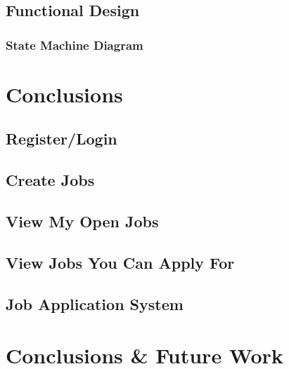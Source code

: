 \section{Functional Design}

\subsection{State Machine Diagram}



\chapter{Conclusions}

\section{Register/Login}

\section{Create Jobs}

\section{View My Open Jobs}

\section{View Jobs You Can Apply For}

\section{Job Application System}




\chapter{Conclusions \& Future Work}






